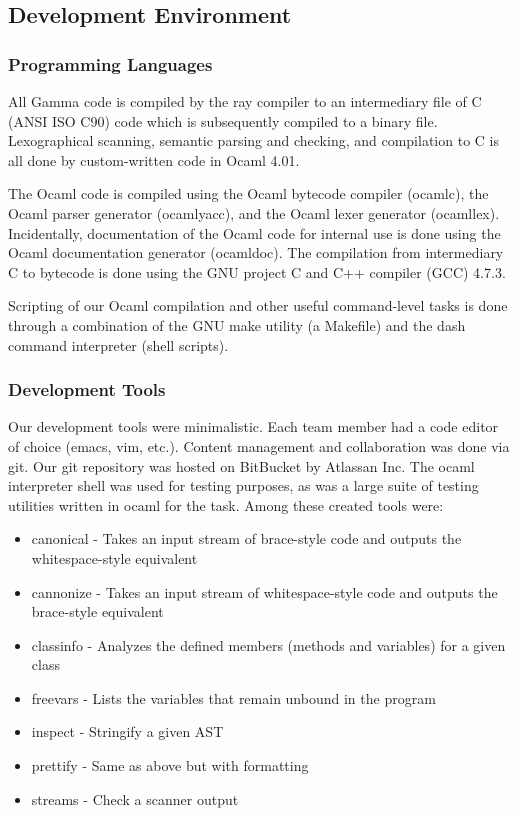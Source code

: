 \pagebreak 
\subsection{Development Environment}

\subsubsection{Programming Languages}
All Gamma code is compiled by the ray compiler to an intermediary file of C (ANSI ISO C90) code which is subsequently compiled to a binary file. Lexographical scanning, semantic parsing and checking, and compilation to C is all done by custom-written code in Ocaml 4.01.

The Ocaml code is compiled using the Ocaml bytecode compiler (ocamlc), the Ocaml parser generator (ocamlyacc), and the Ocaml lexer generator (ocamllex). Incidentally, documentation of the Ocaml code for internal use is done using the Ocaml documentation generator (ocamldoc). The compilation from intermediary C to bytecode is done using the GNU project C and C++ compiler (GCC) 4.7.3.

Scripting of our Ocaml compilation and other useful command-level tasks is done through a combination of the GNU make utility (a Makefile) and the dash command interpreter (shell scripts).

\subsubsection{Development Tools}
Our development tools were minimalistic. Each team member had a code editor of choice (emacs, vim, etc.). Content management and collaboration was done via git. Our git repository was hosted on BitBucket by Atlassan Inc. The ocaml interpreter shell was used for testing purposes, as was a large suite of testing utilities written in ocaml for the task. Among these created tools were:
\begin{itemize}
\item canonical - Takes an input stream of brace-style code and outputs the whitespace-style equivalent
\item cannonize - Takes an input stream of whitespace-style code and outputs the brace-style equivalent
\item classinfo - Analyzes the defined members (methods and variables) for a given class
\item freevars - Lists the variables that remain unbound in the program
\item inspect - Stringify a given AST
\item prettify - Same as above but with formatting
\item streams - Check a scanner output
\end{itemize}
